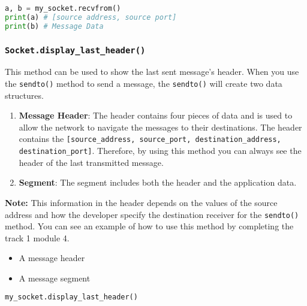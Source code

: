 \documentclass[11pt]{article}
\begin{document}
\begin{lstlisting}[caption={Example for using \texttt{recvfrom()}}, language=Python]
a, b = my_socket.recvfrom()
print(a) # [source address, source port]
print(b) # Message Data
\end{lstlisting}

\subsubsection{\texttt{Socket.\textbf{display\_last\_header()}}}
This method can be used to show the last sent message's header. When you use the \texttt{sendto()} method to send a message, the \texttt{sendto()} will create two data structures.
\begin{enumerate}
    \item \textbf{Message Header}: The header contains four pieces of data and is used to allow the network to navigate the messages to their destinations. The header contains the \texttt{[source\_address, source\_port, destination\_address, destination\_port]}. Therefore, by using this method you can always see the header of the last transmitted message.
    \item \textbf{Segment}: The segment includes both the header and the application data.
\end{enumerate}

\textbf{Note:}
This information in the header depends on the values of the source address and how the developer specify the destination receiver for the \texttt{sendto()} method. You can see an example of how to use this method by completing the track 1 module 4.

\begin{itemize}
    \item A message header

    \item A message segment
\end{itemize}

\begin{lstlisting}[caption={Example for using \texttt{display\_last\_header()}}, language=Python]
my_socket.display_last_header()
\end{lstlisting}
\end{document}
